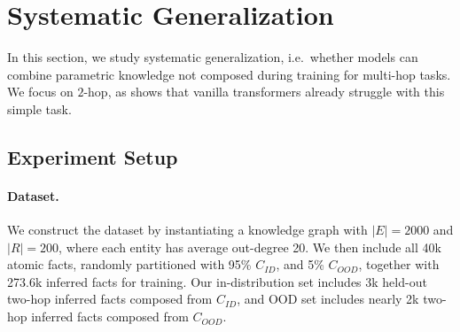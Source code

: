 \documentclass{article} %
\newcommand{\yy}[1]{\textcolor{blue}{[Yuekun: #1]}}
\begin{document}
\section{Systematic Generalization}\label{sec:systematicity}
In this section, we study systematic generalization, i.e.\ whether models can combine parametric knowledge not composed during training for multi-hop tasks. 
We focus on $2$-hop, as \citet{10.5555/3737916.3740933} shows that vanilla transformers already struggle with this simple task.
\subsection{Experiment Setup} \label{sec:systematicity:setup}
\paragraph{Dataset.} We construct the dataset by instantiating a knowledge graph with $|E|=2000$ and $|R|=200$, where each entity has average out-degree 20. 
We then include all 40k atomic facts, randomly partitioned with 95\% $C_{ID}$, and 5\% $C_{OOD}$, together with 273.6k inferred facts for training. 
Our in-distribution set includes 3k held-out two-hop inferred facts composed from $C_{ID}$, and OOD set includes nearly 2k two-hop inferred facts composed from $C_{OOD}$.
\end{document}
